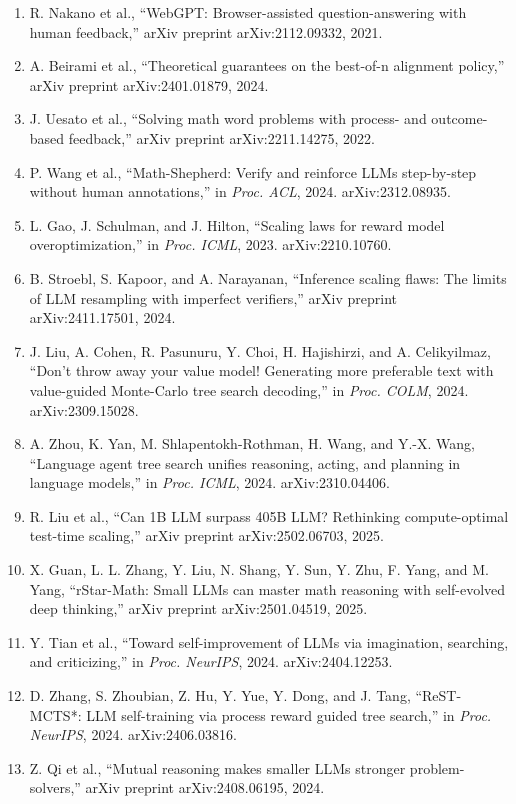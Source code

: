 \documentclass[10pt]{article}
\begin{document}
\begin{enumerate}
\item[{[26]}] R. Nakano et al., ``WebGPT: Browser-assisted question-answering with human feedback,'' arXiv preprint arXiv:2112.09332, 2021.
\item[{[27]}] A. Beirami et al., ``Theoretical guarantees on the best-of-n alignment policy,'' arXiv preprint arXiv:2401.01879, 2024.
\item[{[28]}] J. Uesato et al., ``Solving math word problems with process- and outcome-based feedback,'' arXiv preprint arXiv:2211.14275, 2022.
\item[{[29]}] P. Wang et al., ``Math-Shepherd: Verify and reinforce LLMs step-by-step without human annotations,'' in \emph{Proc. ACL}, 2024. arXiv:2312.08935.
\item[{[30]}] L. Gao, J. Schulman, and J. Hilton, ``Scaling laws for reward model overoptimization,'' in \emph{Proc. ICML}, 2023. arXiv:2210.10760.
\item[{[31]}] B. Stroebl, S. Kapoor, and A. Narayanan, ``Inference scaling flaws: The limits of LLM resampling with imperfect verifiers,'' arXiv preprint arXiv:2411.17501, 2024.
\item[{[32]}] J. Liu, A. Cohen, R. Pasunuru, Y. Choi, H. Hajishirzi, and A. Celikyilmaz, ``Don't throw away your value model! Generating more preferable text with value-guided Monte-Carlo tree search decoding,'' in \emph{Proc. COLM}, 2024. arXiv:2309.15028.
\item[{[33]}] A. Zhou, K. Yan, M. Shlapentokh-Rothman, H. Wang, and Y.-X. Wang, ``Language agent tree search unifies reasoning, acting, and planning in language models,'' in \emph{Proc. ICML}, 2024. arXiv:2310.04406.
\item[{[34]}] R. Liu et al., ``Can 1B LLM surpass 405B LLM? Rethinking compute-optimal test-time scaling,'' arXiv preprint arXiv:2502.06703, 2025.
\item[{[35]}] X. Guan, L. L. Zhang, Y. Liu, N. Shang, Y. Sun, Y. Zhu, F. Yang, and M. Yang, ``rStar-Math: Small LLMs can master math reasoning with self-evolved deep thinking,'' arXiv preprint arXiv:2501.04519, 2025.
\item[{[36]}] Y. Tian et al., ``Toward self-improvement of LLMs via imagination, searching, and criticizing,'' in \emph{Proc. NeurIPS}, 2024. arXiv:2404.12253.
\item[{[37]}] D. Zhang, S. Zhoubian, Z. Hu, Y. Yue, Y. Dong, and J. Tang, ``ReST-MCTS*: LLM self-training via process reward guided tree search,'' in \emph{Proc. NeurIPS}, 2024. arXiv:2406.03816.
\item[{[38]}] Z. Qi et al., ``Mutual reasoning makes smaller LLMs stronger problem-solvers,'' arXiv preprint arXiv:2408.06195, 2024.

\end{enumerate}
\end{document}
